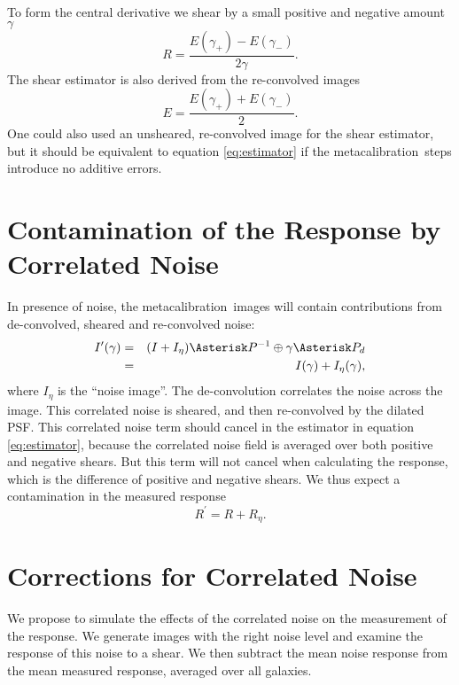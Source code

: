 \documentclass[usegraphicx,usenatbib]{mn2e}
\newcommand{\mcal}{metacalibration}
\begin{document}
To form the central derivative we shear by a small positive and negative
amount $\gamma$
\begin{equation} \label{eq:Rnum}
    R = \frac{E(\gamma_+) - E(\gamma_-)}{2 \gamma}.
\end{equation}
The shear estimator is also derived from the re-convolved
images
\begin{equation} \label{eq:estimator}
    E = \frac{E(\gamma_+) + E(\gamma_-)}{2}.
\end{equation}
One could also used an unsheared, re-convolved image for the
shear estimator, but it should be
equivalent to equation \ref{eq:estimator} if the \mcal\ steps
introduce no additive errors.

\section{Contamination of the Response by Correlated Noise} \label{sec:contam}

In presence of noise, the \mcal\ images will contain
contributions from de-convolved, sheared and re-convolved noise:
\begin{eqnarray}
    I^{\prime}(\gamma) & = & (I + I_\eta) \Asterisk P^{-1} \oplus \gamma \Asterisk P_{d} \nonumber \\
    & = & I(\gamma) + I_\eta(\gamma),
\end{eqnarray}
where $I_\eta$ is the ``noise image''.  The de-convolution correlates the noise
across the image.  This correlated noise is sheared, and then re-convolved by
the dilated PSF.  This correlated noise term should cancel in the estimator in
equation \ref{eq:estimator}, because the correlated noise field is averaged
over both positive and negative shears.  But this term will not cancel when
calculating the response, which is the difference of positive and negative
shears.  We thus expect a contamination in the measured response
\begin{equation}
    R^{\prime}  =  R + R_{\eta}.
\end{equation}

\section{Corrections for Correlated Noise} \label{sec:corr}

We propose to simulate the effects of the correlated noise on the measurement
of the response.  We generate images with the right noise level and examine
the response of this noise to a shear.  We then subtract the mean noise
response from the mean measured response, averaged over all galaxies.
\end{document}
